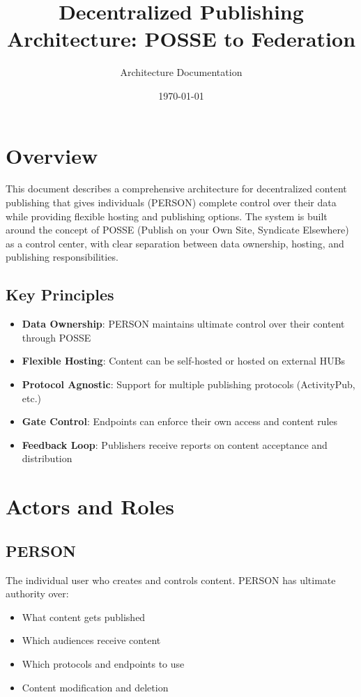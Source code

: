 \documentclass[11pt]{article}
\title{Decentralized Publishing Architecture: POSSE to Federation}
\author{Architecture Documentation}
\date{\today}
\begin{document}
\maketitle

\tableofcontents
\newpage

\section{Overview}

This document describes a comprehensive architecture for decentralized content publishing that gives individuals (PERSON) complete control over their data while providing flexible hosting and publishing options. The system is built around the concept of POSSE (Publish on your Own Site, Syndicate Elsewhere) as a control center, with clear separation between data ownership, hosting, and publishing responsibilities.

\subsection{Key Principles}

\begin{itemize}
    \item \textbf{Data Ownership}: PERSON maintains ultimate control over their content through POSSE
    \item \textbf{Flexible Hosting}: Content can be self-hosted or hosted on external HUBs
    \item \textbf{Protocol Agnostic}: Support for multiple publishing protocols (ActivityPub, etc.)
    \item \textbf{Gate Control}: Endpoints can enforce their own access and content rules
    \item \textbf{Feedback Loop}: Publishers receive reports on content acceptance and distribution
\end{itemize}

\section{Actors and Roles}

\subsection{PERSON}
The individual user who creates and controls content. PERSON has ultimate authority over:
\begin{itemize}
    \item What content gets published
    \item Which audiences receive content
    \item Which protocols and endpoints to use
    \item Content modification and deletion
\end{itemize}
\end{document}
